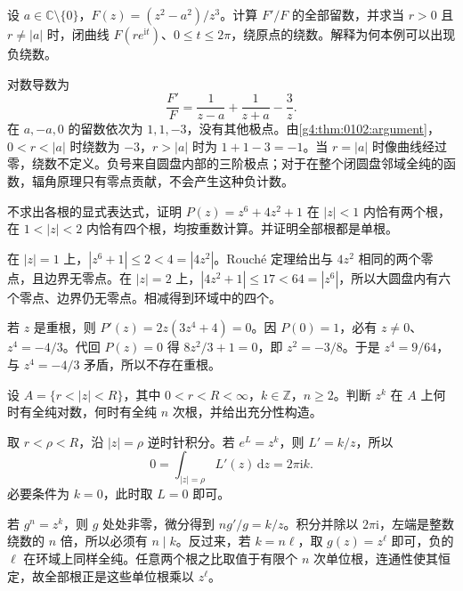 \begin{exercise}
	\label{g4:ex:0101:residue-order}
	设 \(a\in\mathbb C\setminus\{0\}\)，\(F(z)=(z^2-a^2)/z^3\)。计算 \(F'/F\) 的全部留数，并求当 \(r>0\) 且 \(r\ne|a|\) 时，闭曲线 \(F(r e^{\mathrm i t})\)、\(0\le t\le2\pi\)，绕原点的绕数。解释为何本例可以出现负绕数。
\end{exercise}
\begin{solution}
	对数导数为
	\[
		\frac{F'}F=\frac1{z-a}+\frac1{z+a}-\frac3z.
	\]
	在 \(a,-a,0\) 的留数依次为 \(1,1,-3\)，没有其他极点。由\cref{g4:thm:0102:argument}，\(0<r<|a|\) 时绕数为 \(-3\)，\(r>|a|\) 时为 \(1+1-3=-1\)。当 \(r=|a|\) 时像曲线经过零，绕数不定义。负号来自圆盘内部的三阶极点；对于在整个闭圆盘邻域全纯的函数，辐角原理只有零点贡献，不会产生这种负计数。
\end{solution}

\begin{exercise}
	\label{g4:ex:0101:rouche-polynomial}
	不求出各根的显式表达式，证明 \(P(z)=z^6+4z^2+1\) 在 \(|z|<1\) 内恰有两个根，在 \(1<|z|<2\) 内恰有四个根，均按重数计算。并证明全部根都是单根。
\end{exercise}
\begin{solution}
	在 \(|z|=1\) 上，\(|z^6+1|\le2<4=|4z^2|\)。Rouché 定理给出与 \(4z^2\) 相同的两个零点，且边界无零点。在 \(|z|=2\) 上，\(|4z^2+1|\le17<64=|z^6|\)，所以大圆盘内有六个零点、边界仍无零点。相减得到环域中的四个。

	若 \(z\) 是重根，则 \(P'(z)=2z(3z^4+4)=0\)。因 \(P(0)=1\)，必有 \(z\ne0\)、\(z^4=-4/3\)。代回 \(P(z)=0\) 得 \(8z^2/3+1=0\)，即 \(z^2=-3/8\)。于是 \(z^4=9/64\)，与 \(z^4=-4/3\) 矛盾，所以不存在重根。
\end{solution}

\begin{exercise}
	\label{g4:ex:0101:annular-roots}
	设 \(A=\{r<|z|<R\}\)，其中 \(0<r<R<\infty\)，\(k\in\mathbb Z\)，\(n\ge2\)。判断 \(z^k\) 在 \(A\) 上何时有全纯对数，何时有全纯 \(n\) 次根，并给出充分性构造。
\end{exercise}
\begin{solution}
	取 \(r<\rho<R\)，沿 \(|z|=\rho\) 逆时针积分。若 \(e^L=z^k\)，则 \(L'=k/z\)，所以
	\[
		0=\int_{|z|=\rho}L'(z)\,\mathrm{d}z=2\pi\mathrm i k.
	\]
	必要条件为 \(k=0\)，此时取 \(L=0\) 即可。

	若 \(g^n=z^k\)，则 \(g\) 处处非零，微分得到 \(n g'/g=k/z\)。积分并除以 \(2\pi\mathrm i\)，左端是整数绕数的 \(n\) 倍，所以必须有 \(n\mid k\)。反过来，若 \(k=n\ell\)，取 \(g(z)=z^\ell\) 即可，负的 \(\ell\) 在环域上同样全纯。任意两个根之比取值于有限个 \(n\) 次单位根，连通性使其恒定，故全部根正是这些单位根乘以 \(z^\ell\)。
\end{solution}

